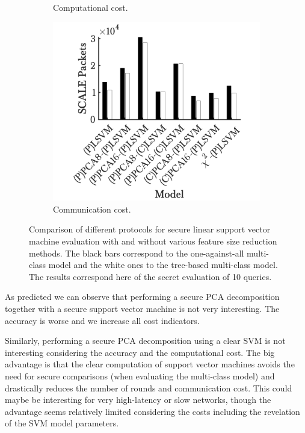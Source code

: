 \begin{figure}[h!]
\begin{subfigure}[b]{.49\textwidth}
            \caption{Computational cost.} 
        \end{subfigure}
        \hfill
        \begin{subfigure}[b]{.49\textwidth}   
            \centering 
            \includegraphics[width=.98\textwidth]{parts/chap-4/img-svm/lsvm-timing/comm.png}
            \caption{Communication cost.} 
        \end{subfigure}
        \caption[Comparison of the different LSVM models using MPC.]{Comparison of different protocols for secure linear support vector machine evaluation with and without various feature size reduction methods. The black bars correspond to the one-against-all multi-class model and the white ones to the tree-based multi-class model. The results correspond here of the secret evaluation of 10 queries.}
        \label{fig:eval-lsvm}
\end{figure}

As predicted we can observe that performing a secure PCA decomposition together with a secure support vector machine is not very interesting. The accuracy is worse and we increase all cost indicators. 

Similarly, performing a secure PCA decomposition using a clear SVM is not interesting considering the accuracy and the computational cost. The big advantage is that the clear computation of support vector machines avoids the need for secure comparisons (when evaluating the multi-class model) and drastically reduces the number of rounds and communication cost. This could maybe be interesting for very high-latency or slow networks, though the advantage seems relatively limited considering the costs including the revelation of the SVM model parameters.

